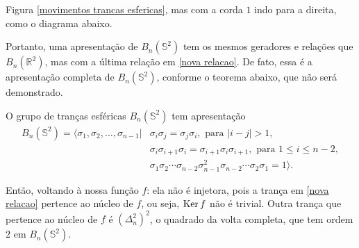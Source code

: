 	Figura \ref{movimentos trancas esfericas}, mas com a corda $1$ indo para a direita, 
	como o diagrama abaixo.
	\begin{center}
	\end{center}
	Portanto, uma apresentação de $B_n(\mathbb{S}^2)$ tem os mesmos geradores e relações 
	que $B_n(\mathbb{R}^2)$, mas com a última relação em \eqref{nova relacao}. 
	De fato, essa é a apresentação completa de $B_n(\mathbb{S}^2)$, conforme o teorema abaixo, 
	que não será demonstrado.
	\begin{theorem}
	\label{apresentacao de B_n(S^2)}
		O grupo de tranças esféricas $B_n(\mathbb{S}^2)$ tem apresentação
		\begin{align*}
    		B_n(\mathbb{S}^2) 
    		= \langle \sigma_1, \sigma_2, \dots, \sigma_{n-1}|&\sigma_i\sigma_j 
    		= \sigma_j\sigma_i, \text{ para } |i - j|>1, \\ 
    		&\sigma_i\sigma_{i+1}\sigma_i 
    		= \sigma_{i+1}\sigma_i\sigma_{i+1}, \text{ para } 1\leq i\leq n-2 , \\
    		&\sigma_1\sigma_2\cdots\sigma_{n-2}\sigma_{n-1}^2\sigma_{n-2}\cdots\sigma_2\sigma_1 = 1 \rangle.
		\end{align*}
	\end{theorem}  
	Então, voltando à nossa função $f$: ela não é injetora, pois a trança em \eqref{nova relacao} 
	pertence ao núcleo de $f$, ou seja, $\operatorname{Ker} f$ não é trivial. Outra trança que pertence ao núcleo 
	de $f$ é $\displaystyle{(\Delta_n^2)^2}$, o quadrado da volta completa, que tem ordem 
	$2$ em $B_n(\mathbb{S}^2)$.
	
